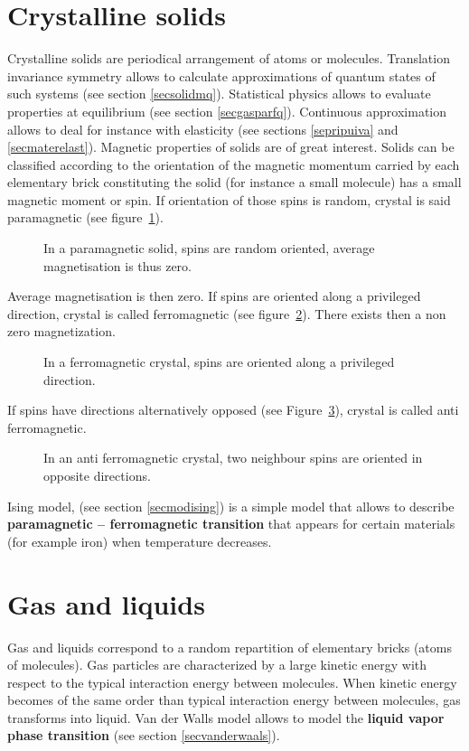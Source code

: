 \documentclass[12pt]{book}
\begin{document}
\section{Crystalline solids}
Crystalline solids\cite{ph:solid:Kittel67,ph:solid:Ashcroft76} are  periodical
arrangement of atoms or molecules. 
Translation invariance symmetry allows to calculate approximations of quantum
states of such systems (see section \ref{secsolidmq}). 
Statistical physics allows to evaluate properties at equilibrium (see section
\ref{secgasparfq}). 
Continuous approximation allows to deal for instance with elasticity (see
sections \ref{sepripuiva} and \ref{secmaterelast}).  
Magnetic properties of solids are of great interest.
Solids can be classified according to the orientation of the magnetic
momentum carried by each elementary brick constituting  the solid (for
instance a small 
molecule) has a small magnetic moment  or spin.
If orientation of those spins is random, crystal is said paramagnetic
 (see figure~\ref{figparamag}). 
\begin{figure}[htb]
 \centerline{}   
 \caption{In a paramagnetic solid, spins are random oriented, average
   magnetisation is thus zero.}
 \label{figparamag}
\end{figure}
Average magnetisation is then zero. If spins are oriented along a privileged
direction, crystal is called ferromagnetic   (see
figure~\ref{figferromag}). There exists then a non zero magnetization.
\begin{figure}[htb]
 \centerline{}   
 \caption{In a ferromagnetic crystal, spins are oriented along a
   privileged direction.}
 \label{figferromag}
\end{figure}
If spins have directions alternatively opposed (see
Figure~\ref{figantiferromag}), crystal is called anti ferromagnetic.
\begin{figure}[htb]
 \centerline{}   
 \caption{In an anti ferromagnetic crystal, two neighbour spins are oriented in
   opposite directions.}
 \label{figantiferromag}
\end{figure}
Ising model, (see section \ref{secmodising}) is a simple model that allows to
describe 
{\bf paramagnetic -- ferromagnetic transition} that appears for certain
materials (for example iron) when temperature decreases.
\section{Gas and liquids}
Gas and liquids \cite{ph:physt:Diu89} 
correspond to a random repartition of elementary bricks (atoms of
molecules). Gas particles are characterized by a large kinetic energy with
respect to the typical interaction energy between molecules.
When kinetic energy becomes of the same order than typical interaction energy
between molecules, gas transforms into liquid.
Van der Walls model allows to model the {\bf liquid
  vapor phase transition} (see section \ref{secvanderwaals}).
\end{document}
